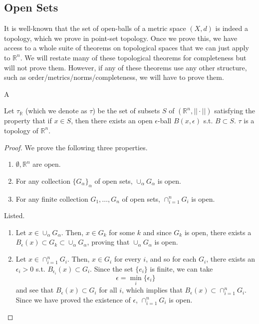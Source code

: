 \documentclass{article}
\begin{document}
  \subsection{Open Sets} 

      It is well-known that the set of open-balls of a metric space $(X, d)$ is indeed a topology, which we prove in point-set topology. Once we prove this, we have access to a whole suite of theorems on topological spaces that we can just apply to $\mathbb{R}^n$. We will restate many of these topological theorems for completeness but will not prove them. However, if any of these theorems use any other structure, such as order/metrics/norms/completeness, we will have to prove them. 

      \begin{definition}[Topology]
        A 
      \end{definition}

      \begin{theorem}
        Let $\tau_{\mathbb{R}}$ (which we denote as $\tau$) be the set of subsets $S$ of $(\mathbb{R}^n, || \cdot ||)$ satisfying the property that if $x \in S$, then there exists an open $\epsilon$-ball $B(x, \epsilon)$ s.t. $B \subset S$. $\tau$ is a topology of $\mathbb{R}^n$. 
      \end{theorem} 
      \begin{proof} 
        We prove the following three properties. 
        \begin{enumerate}
          \item $\emptyset, \mathbb{R}^n$ are open. 
          \item For any collection $\{G_\alpha\}_\alpha$ of open sets, $\cup_\alpha G_\alpha$ is open.  
          \item For any finite collection $G_1, \ldots, G_n$ of open sets, $\cap_{i=1}^n G_i$ is open. 
        \end{enumerate}
        Listed. 
        \begin{enumerate}
          \item Let $x \in \cup_\alpha G_\alpha$. Then, $x \in G_k$ for some $k$ and since $G_k$ is open, there exists a $B_\epsilon (x) \subset G_k \subset \cup_{\alpha} G_\alpha$, proving that $\cup_\alpha G_\alpha$ is open. 
          \item Let $x \in \cap_{i=1}^n G_i$. Then, $x \in G_i$ for every $i$, and so for each $G_i$, there exists an $\epsilon_i > 0$ s.t. $B_{\epsilon_i} (x) \subset G_i$. Since the set $\{e_i\}$ is finite, we can take 
          \[\epsilon = \min_i \{\epsilon_i\}\]
          and see that $B_\epsilon (x) \subset G_i$ for all $i$, which implies that $B_\epsilon (x) \subset \cap_{i=1}^n G_i$. Since we have proved the existence of $\epsilon$, $\cap_{i=1}^n G_i$ is open. 
        \end{enumerate}
      \end{proof}
\end{document}
